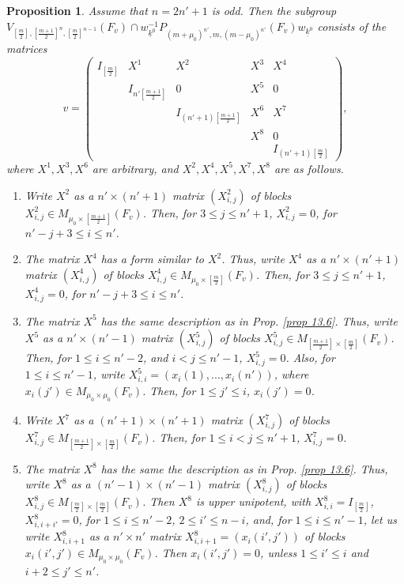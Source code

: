 \documentclass[12pts]{amsart}
\newtheorem{prop}[thm]{Proposition}
\begin{document}
\begin{prop}\label{prop 13.7}
	Assume that $n=2n'+1$ is odd. Then the subgroup\\ $V_{[\frac{m}{2}],[\frac{m+1}{2}]^n,[\frac{m}{2}]^{n-1}}(F_v)\cap w^{-1}_{\underline{k}^0}P_{(m+\mu_0)^{n'},m, (m-\mu_0)^{n'}}(F_v)w_{\underline{k}^0}$ consists of the matrices 
	\begin{equation}\label{13.30}
	v=\begin{pmatrix}I_{[\frac{m}{2}]}&X^1&X^2&X^3&X^4\\&I_{n'[\frac{m+1}{2}]}&0&X^5&0\\&&I_{(n'+1)[\frac{m+1}{2}]}&X^6&X^7\\&&&X^8&0\\&&&&I_{(n'+1)[\frac{m}{2}]}\end{pmatrix},
	\end{equation}
	where $X^1, X^3, X^6$ are arbitrary, and $X^2, X^4, X^5, X^7, X^8$ are as follows.\\
	\begin{enumerate}
		\item Write $X^2$ as a $n'\times (n'+1)$ matrix $(X^2_{i,j})$ of blocks $X^2_{i,j}\in M_{\mu_0\times [\frac{m+1}{2}]}(F_v)$. Then, for $3\leq j\leq n'+1$, $X^2_{i,j}=0$, for $n'-j+3\leq i\leq n'$.\\
		\item The matrix $X^4$ has a form similar to $X^2$. Thus, write $X^4$ as a $n'\times (n'+1)$ matrix $(X^4_{i,j})$ of blocks $X^4_{i,j}\in M_{\mu_0\times [\frac{m}{2}]}(F_v)$. Then, for $3\leq j\leq n'+1$, $X^4_{i,j}=0$, for $n'-j+3\leq i\leq n'$.\\
		\item The matrix $X^5$ has the same description as in Prop. \ref{prop 13.6}. Thus, write $X^5$ as a $n'\times (n'-1)$ matrix $(X^5_{i,j})$ of blocks $X^5_{i,j}\in M_{[\frac{m+1}{2}]\times [\frac{m}{2}]}(F_v)$. Then, for $1\leq i\leq n'-2$, and $i<j\leq n'-1$, $X^5_{i,j}=0$. Also, for $1\leq i\leq n'-1$, write $X^5_{i,i}=(x_i(1),...,x_i(n'))$, where $x_i(j')\in M_{\mu_0\times \mu_0}(F_v)$. Then, for $1\leq j'\leq i$, $x_i(j')=0$.\\
		\item Write $X^7$ as a $(n'+1)\times (n'+1)$ matrix $(X^7_{i,j})$ of blocks $X^7_{i,j}\in M_{[\frac{m+1}{2}]\times [\frac{m}{2}]}(F_v)$. Then, for $1\leq i<j\leq n'+1$, $X^7_{i,j}=0$.\\
		\item The matrix $X^8$ has the same the description as in Prop. \ref{prop 13.6}. Thus, write $X^8$ as a $(n'-1)\times (n'-1)$ matrix $(X^8_{i,j})$ of blocks $X^8_{i,j}\in M_{[\frac{m}{2}]\times [\frac{m}{2}]}(F_v)$. Then $X^8$ is upper unipotent, with $X^8_{i,i}=I_{[\frac{m}{2}]}$, $X^8_{i,i+i'}=0$, for $1\leq i\leq n'-2$, $2\leq i'\leq n-i$, and, for $1\leq i\leq n'-1$, let us write $X^8_{i,i+1}$ as a $n'\times n'$ matrix  $X^8_{i,i+1}=(x_i(i',j'))$ of blocks $x_i(i',j')\in M_{\mu_0\times \mu_0}(F_v)$. Then $x_i(i',j')=0$, unless $1\leq i'\leq i$ and $i+2\leq j'\leq n'$. 
	\end{enumerate}
	
\end{prop}
 
\end{document}
